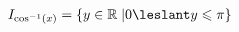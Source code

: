 \documentclass[preview]{standalone}
\begin{document}
\begin{align*}
I_{\cos^{-1}(x)} = \{ y \in \mathbb{R} \; | 0 \leslant y \leqslant \pi \}
\end{align*}
\end{document}
